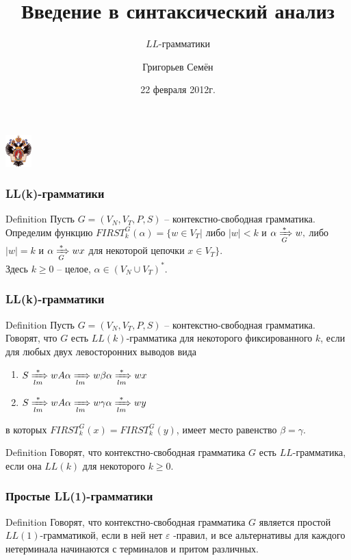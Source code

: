 \documentclass{beamer}
\title[]{Введение в синтаксический анализ}
\subtitle[Лекция 3]{$LL$-грамматики}
\institute[СПбГУ]{
Санкт-Петербургский государственный университет \\
Математико-Механический факультет \\
Кафедра системного программирования }
\author[Григорьев Семён]{Григорьев Семён}
\date{22 февраля 2012г.}
\begin{document}
{
    \begin{frame}
        \begin{center}
        {\includegraphics[width=1cm]{SPbGU_Logo.png}}
        \end{center}

        \titlepage

    \end{frame}
}

\begin{frame}
	\transwipe[direction=90]
	\frametitle{LL(k)-грамматики}
	\begin{block}{Definition}
		Пусть $G = (V_N, V_T, P, S)$ -- контекстно-свободная грамматика. Определим функцию $FIRST_k^G (\alpha) = \{w \in V_T | $ либо $ |w| < k $ и $ \alpha \xRightarrow[G]{*}w, $ либо $ |w| = k$ и $\alpha \xRightarrow[G]{*} wx$ для некоторой цепочки $ x \in V_T \}$. \\ Здесь $k \geq 0$ -- целое, $\alpha \in  (V_N \cup V_T )^*$.
	\end{block}
\end{frame}

\begin{frame}
	\transwipe[direction=90]
	\frametitle{LL(k)-грамматики}
	\begin{block}{Definition}
		Пусть $G = (V_N , V_T , P, S )$ -- контекстно-свободная грамматика. Говорят, что $G$ есть $LL(k )$-грамматика для некоторого
фиксированного $k$, если для любых двух левосторонних выводов вида 
    \begin {enumerate}
        \item $S \xRightarrow[lm]{*} wA\alpha \xRightarrow[lm]{} w \beta \alpha \xRightarrow[lm]{*} wx$
        \item $ S \xRightarrow[lm]{*} wA\alpha \xRightarrow[lm]{} w \gamma\alpha \xRightarrow[lm]{*} wy $
    \end{enumerate}
в которых $FIRST_k^G (x) = FIRST_k^G (y)$, имеет место равенство $\beta = \gamma$.
	\end{block}
	\begin{block}{Definition}
		Говорят, что контекстно-свободная грамматика $G$ есть $LL$-грамматика, если она $LL(k )$ для некоторого $k \geq 0$.
	\end{block}
\end{frame}

\begin{frame}
	\transwipe[direction=90]
	\frametitle{Простые LL(1)-грамматики}
	\begin{block}{Definition}
		Говорят, что контекстно-свободная грамматика $G$ является простой $LL(1)$-грамматикой, если в ней нет $\varepsilon$ -правил, и все
альтернативы для каждого нетерминала начинаются с терминалов и притом различных.
	\end{block}
\end{frame}
\end{document}
